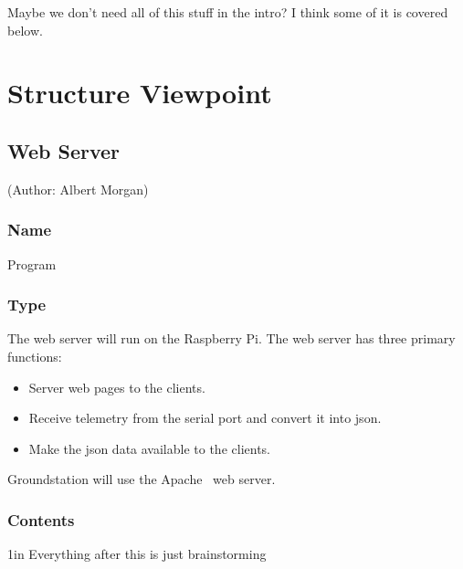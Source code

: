 \documentclass[10pt,draftclsnofoot,onecolumn]{IEEEtran}
\newcommand{\newelement}[5]{
	\subsection{#1} (Author: #2)
	\subsubsection{Name}
	#3
	\subsubsection{Type}
	#4
	\subsubsection{Contents}
	#5
}
\begin{document}
	Maybe we don't need all of this stuff in the intro? I think some of it is covered below.

	
	
	\section{Structure Viewpoint}
		
	
	
	
	\newelement
	{Web Server}
	{Albert Morgan}
	{Program}
	{	The web server will run on the Raspberry Pi. The web server has three primary functions:
		\begin{itemize}
			\item Server web pages to the clients.
			\item Receive telemetry from the serial port and convert it into json.
			\item Make the json data available to the clients.
		\end{itemize}
		Groundstation will use the Apache~\cite{Apache} web server.
	}


	
	
	
	
	
	\vspace{1in}
	{\Huge Everything after this is just brainstorming}
	
\end{document}
